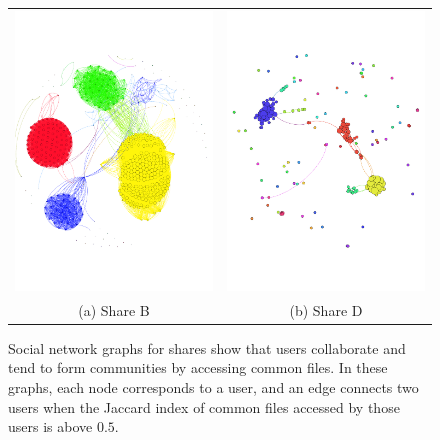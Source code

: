 \begin{figure}[!htbp]
\centering
\begin{tabular}{cc}
\centering
\includegraphics[trim = 0 4cm 2mm 5cm, clip, width=0.45\linewidth]{FileAccess/figs/6261_jacc_pt5}
& 
\includegraphics[trim = 2mm 4cm 7mm 5cm, clip, width=0.46\linewidth]{FileAccess/figs/6216_jacc_pt5} \\ 
(a) Share B & (b) Share D \\ 
\end{tabular}
\caption[Social network graphs for shares show that users collaborate
  and tend to form communities by accessing common files. ]{Social network graphs for shares show that users collaborate
  and tend to form communities by accessing common files.  In these
  graphs, each node corresponds to a user, and an edge connects two users
  when the Jaccard index of common files accessed by those users is
  above $0.5$.}
\label{fig:snagraphs}
\end{figure}

